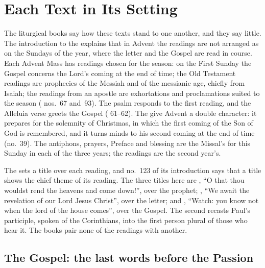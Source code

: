 \section{Each Text in Its Setting}
\label{sec:each-element}

The liturgical books say how these texts stand to one another, and they say
little. The introduction to the  explains that in
Advent the readings are not arranged as on the Sundays of the year, where the
letter and the Gospel are read in course. Each Advent Mass has readings chosen
for the season: on the First Sunday the Gospel concerns the Lord's coming at
the end of time; the Old Testament readings are prophecies of the Messiah and
of the messianic age, chiefly from Isaiah; the readings from an apostle are
exhortations and proclamations suited to the season (
nos.~67 and~93). The psalm responds to the first reading, and the Alleluia verse
greets the Gospel ( 61--62). The
 give Advent a double character:
it prepares for the solemnity of Christmas, in which the first coming of the
Son of God is remembered, and it turns minds to his second coming at the end
of time (no.~39). The antiphons, prayers, Preface and blessing are the
Missal's for this Sunday in each of the three years; the readings are the
second year's.

The  sets a title over each reading, and no.~123 of its
introduction says that a title shows the chief theme of its reading. The three
titles here are , ``O that
thou wouldst rend the heavens and come down!'', over the prophet;
, ``We await the
revelation of our Lord Jesus Christ'', over the letter; and , ``Watch: you know not when the lord of
the house comes'', over the Gospel. The second recasts Paul's participle,
spoken of the Corinthians, into the first person plural of those who hear it.
The books pair none of the readings with another.

\subsection{The Gospel: the last words before the Passion}

